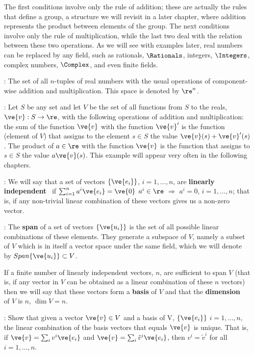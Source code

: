 The first conditions involve only the rule of addition; these are actually the rules that 
define a group, a structure we will revisit in a later chapter, where addition represents the product between elements of the group.
The next conditions involve only the rule of multiplication, while
the last two deal with the relation between these two operations. As we will see with examples later, real numbers can be replaced by any field, such as rationals, $\Rationals$, integers, $\Integers$, complex numbers, $\Complex$, and even finite fields.

\espa

\ejem: The set of all $n$-tuples of real numbers with the
usual operations of component-wise addition and multiplication.
This space is denoted by $\re^n$.

\ejem: Let $S$ be any set and let $V$ be the set of all functions
from $S$ to the reals, $\ve{v}:S \to \re$, with the following
operations of addition and multiplication: the sum of the function $\ve{v}$ with
the function $\ve{v}'$ is the function (element of $V$) that assigns to the element
$s \in S$ the value $\ve{v}(s) + \ve{v}'(s)$. The product of
$a \in \re$ with the function $\ve{v}$ is the function that assigns to $s \in S$
the value $a\ve{v}(s)$.
This example will appear very often in the following chapters.

: We will say that a set of vectors $\{\ve{e_i}\}$, $i=1, \ldots ,n$,
are {\bf linearly independent}~ 
if $\sum_{i=1}^{n} a^i \ve{e_i} = \ve{0}$ $a^i \in \re$ $\Longrightarrow $ $a^i = 0$, $i= 1, \ldots ,n$;
that is, if any non-trivial linear combination of these vectors gives us a non-zero vector. 

: The {\bf span} of a set of vectors $\{\ve{u_{i}}\}$ is the set of all possible linear combinations of these elements. 
They generate a subspace of $V$, namely a subset of $V$ which is in itself a vector space under the same field,
which we will denote by $Span\{\ve{u_{i}}\}\subset V$. 

If a finite number of linearly independent vectors, 
$n$, are sufficient to span $V$ (that is, if 
any vector in $V$ can be obtained as a linear combination of 
these $n$ vectors) then we will say that these vectors form a {\bf basis} of 
$V$ and that the {\bf dimension}~ of $V$ is $n$, $\dim V = n$.
\espa

\ejer: Show that given a vector $\ve{v} \in V$ and a basis of V, $\{\ve{e_i}\}$ $i=1, \ldots ,n$, the linear combination of the basis vectors that equals $\ve{v}$ is unique. That is, if 
$\ve{v} =  \sum_i v^i \ve{e_i} $ and $\ve{v} = \sum_i \tilde{v}^i \ve{e_i} $, then $v^i=\tilde{v}^i$ for all
$i=1, \ldots ,n$.

